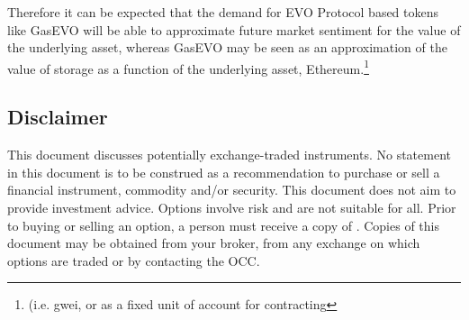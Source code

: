 Therefore it can be expected that the demand for EVO Protocol based tokens like GasEVO will be able to approximate future market sentiment for the value of the underlying asset, whereas GasEVO may be seen as an approximation of the value of storage as a function of the underlying asset, Ethereum.\footnote{ (i.e. gwei, or as a fixed unit of account for contracting}

\subsection{Disclaimer}
This document discusses potentially exchange-traded instruments. No statement in this document is to be construed as a recommendation to purchase or sell a financial instrument, commodity and/or security. This document does not aim to provide investment advice. Options involve risk and are not suitable for all. Prior to buying or selling an option, a person must receive a copy of . Copies of this document may be obtained from your broker, from any exchange on which options are traded or by contacting the OCC.

\newpage

